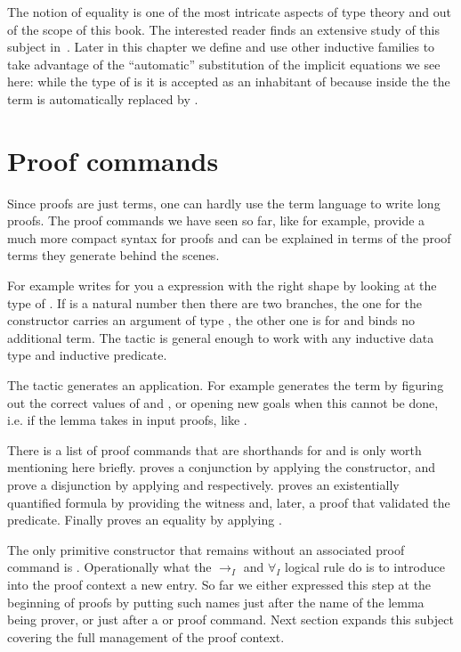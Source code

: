 The notion of equality is one of the most intricate aspects of type
theory and out of the scope of this book.  The interested reader
finds an extensive study of this subject in~\cite{hottbook}.  Later in this
chapter we define and use other inductive families to take advantage
of the ``automatic'' substitution of the implicit equations we see here:
while the type of  is  it is accepted as an
inhabitant of  because inside the  the term 
is automatically replaced by .

\section{Proof commands}

Since proofs are just terms, one can hardly use the term language to
write long proofs.   The proof commands we have seen so far, like
 for example, provide a much more compact syntax for proofs and can be explained in terms of the proof terms they generate behind the scenes.

For example  writes for you a  expression with the right
shape by looking at the type of .  If  is a natural number then there
are two branches, the one for the  constructor carries an argument of type
, the other one is for  and binds no additional term.
The  tactic is general enough to work with any inductive data type
and inductive predicate.

The  tactic generates an application.  For example 
generates the term  by figuring out the correct values of
 and , or opening new goals when this cannot be done, i.e.
if the lemma takes in input proofs, like .

There is a list of proof commands that are shorthands for 
and is only worth mentioning here briefly.  proves a conjunction
by applying the  constructor,  and  prove a
disjunction by applying  and  respectively.
 proves an existentially quantified formula by providing
the witness  and, later, a proof that  validated the predicate.
Finally  proves an equality by applying .

The only primitive constructor that remains without an associated proof command
is .  Operationally what the $\to_I$ and
$\forall_I$ logical rule do is to introduce into the proof context a
new entry.  So far we either expressed this step at the beginning of proofs
by putting such names just after the name of the lemma being prover, or
just after a  or  proof command.  Next section
expands this subject covering the full management of the proof context.

